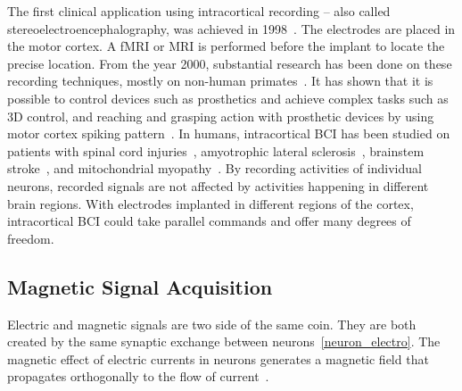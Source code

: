 The first clinical application using intracortical recording -- also called stereoelectroencephalography,  was achieved in 1998~\citep{kennedy_restoration_1998}.
The electrodes are placed in the motor cortex. 
A fMRI or MRI is performed before the implant to locate the precise location.
From the year 2000, substantial research has been done on these recording techniques, mostly on non-human primates~\citep{serruya_brain-machine_2002, taylor_direct_2002, musallam_cognitive_2004, santhanam_high-performance_2006, golub_motor_2014}. 
It has shown that it is possible to control devices such as prosthetics and achieve complex tasks such as 3D control, and reaching and grasping action with prosthetic devices by using motor cortex spiking pattern~\citep{homer_implants_2013}.
In humans, intracortical BCI has been studied on patients with spinal cord injuries~\citep{hochberg_neuronal_2006,hochberg_reach_2012}, amyotrophic lateral sclerosis~\citep{kennedy_restoration_1998}, brainstem stroke~\citep{kennedy_direct_2000}, and mitochondrial myopathy~\citep{kennedy_computer_2004}.
By recording activities of individual neurons, recorded signals are not affected by activities happening in different brain regions. With electrodes implanted in different regions of the cortex, intracortical BCI could take parallel commands and offer many degrees of freedom. 
      
\subsection{Magnetic Signal Acquisition}
\label{magnet_aquisition}
Electric and magnetic signals are two side of the same coin. 
They are both created by the same synaptic exchange between neurons~\ref{neuron_electro}.
The magnetic effect of electric currents in neurons generates a magnetic field that propagates orthogonally to the flow of current~\citep{gazzaniga_cognitive_2013, proverbio_electromagnetic_2003}. 


